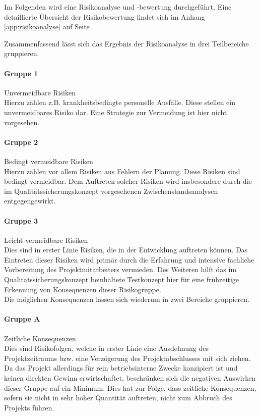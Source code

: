 \documentclass[12pt, xcolor=dvipsnames]{scrartcl}
\begin{document}
Im Folgenden wird eine Risikoanalyse und -bewertung durchgeführt.
Eine detaillierte Übersicht der Risikobewertung findet sich im Anhang \ref{app:risikoanalyse} auf Seite \pageref{app:risikoanalyse}.

Zusammenfassend lässt sich das Ergebnis der Risikoanalyse in drei Teilbereiche gruppieren.

\paragraph{Gruppe 1}
Unvermeidbare Risiken \\
Hierzu zählen z.B. krankheitsbedingte personelle Ausfälle. Diese stellen ein unvermeidbares Risiko dar. Eine Strategie zur Vermeidung ist hier nicht vorgesehen.\\

\paragraph{Gruppe 2}
Bedingt vermeidbare Risiken \\
Hierzu zählen vor allem Risiken aus Fehlern der Planung. Diese Risiken sind bedingt vermeidbar. Dem Auftreten solcher Risiken wird insbesondere durch die im  Qualitätssicherungskonzept vorgesehenen Zwischenstandsanalysen entgegengewirkt.

\paragraph{Gruppe 3}
Leicht vermeidbare Risiken \\
Dies sind in erster Linie Risiken, die in der Entwicklung auftreten können. Das Eintreten dieser Risiken wird primär durch die Erfahrung und intensive fachliche Vorbereitung des Projektmitarbeiters vermieden. Des Weiteren hilft das im Qualitätssicherungskonzept beinhaltete Testkonzept hier für eine frühzeitige Erkennung von Konsequenzen dieser Risikogruppe. \\

Die möglichen Konsequenzen lassen sich wiederum in zwei Bereiche gruppieren.

\paragraph{Gruppe A} Zeitliche Konsequenzen \\
Dies sind Risikofolgen, welche in erster Linie eine Ausdehnung des Projektzeitraums bzw. eine Verzögerung des Projektabschlusses mit sich ziehen. Da das Projekt allerdings für rein betriebsinterne Zwecke konzipiert ist und keinen direkten Gewinn erwirtschaftet, beschränken sich die negativen Auswirken dieser Gruppe auf ein Minimum. Dies hat zur Folge, dass zeitliche Konsequenzen, sofern sie nicht in sehr hoher Quantität auftreten, nicht zum Abbruch des Projekts führen.
\end{document}
